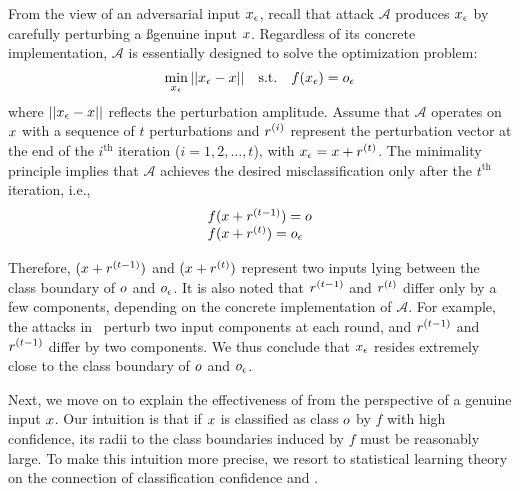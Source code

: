 From the view of an adversarial input $x_{\epsilon}$, recall that attack ${\mathcal A}$ produces $x_{\epsilon}$ by carefully perturbing a ßgenuine input $x$. Regardless of its concrete implementation, ${\mathcal A}$ is essentially designed to solve the optimization problem:
\begin{equation*}
    \min_{x_{\epsilon}} ||x_{\epsilon} - x|| \quad \mathrm{s.t.} \quad f(x_{\epsilon}) = o_\epsilon
\end{equation*}
where $||x_{\epsilon} - x||$ reflects the perturbation amplitude. Assume that ${\mathcal A}$ operates on $x$ with a sequence of $t$ perturbations and $r^{(i)}$ represent the perturbation vector at the end of the $i^{\mathrm{th}}$ iteration ($i = 1, 2, \ldots, t$), with $x_{\epsilon} =  x + r^{(t)}$. The minimality principle implies that ${\mathcal A}$ achieves the desired misclassification only after the $t^{\mathrm{th}}$ iteration, i.e.,
\begin{equation*}
\begin{array}{l}
f(x + r^{(t-1)}) = o\\
f(x + r^{(t)}) = o_\epsilon
\end{array}
\end{equation*}

Therefore, $(x + r^{(t-1)})$ and $(x + r^{(t)})$ represent two inputs lying between the class boundary of $o$ and $o_\epsilon$. It is also noted that $r^{(t-1)}$ and $r^{(t)}$ differ only by a few components, depending on the concrete implementation of ${\mathcal A}$. For example, the attacks in~\cite{Papernot:2016:eurosp,Carlini:2016:arXiv} perturb two input components at each round, and $r^{(t-1)}$ and $r^{(t-1)}$ differ by two components. We thus conclude that $x_{\epsilon}$ resides extremely close to the class boundary of $o$ and $o_\epsilon$.


Next, we move on to explain the effectiveness of \mar from the perspective of a genuine input $x$. Our intuition is that
if $x$ is classified as class $o$ by \dnn $f$ with high confidence, its radii to the class boundaries induced by $f$ must be reasonably large. To make this intuition more precise, we resort to statistical learning theory on the connection of classification confidence and \mar.

